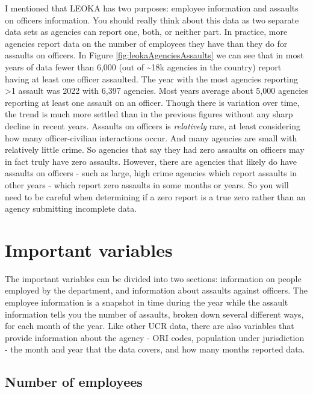 \documentclass[
]{krantz}
\begin{document}
I mentioned that LEOKA has two purposes: employee
information and assaults on officers information. You should
really think about this data as two separate data sets as
agencies can report one, both, or neither part. In practice,
more agencies report data on the number of employees they
have than they do for assaults on officers. In Figure
\ref{fig:leokaAgenciesAssaults} we can see that in most
years of data fewer than 6,000 (out of \textasciitilde18k
agencies in the country) report having at least one officer
assaulted. The year with the most agencies reporting
\textgreater1 assault was 2022 with 6,397 agencies. Most
years average about 5,000 agencies reporting at least one
assault on an officer. Though there is variation over time,
the trend is much more settled than in the previous figures
without any sharp decline in recent years. Assaults on
officers is \emph{relatively} rare, at least considering how
many officer-civilian interactions occur. And many agencies
are small with relatively little crime. So agencies that say
they had zero assaults on officers may in fact truly have
zero assaults. However, there are agencies that likely do
have assaults on officers - such as large, high crime
agencies which report assaults in other years - which report
zero assaults in some months or years. So you will need to
be careful when determining if a zero report is a true zero
rather than an agency submitting incomplete data.

\section{Important variables}\label{important-variables-4}

The important variables can be divided into two sections:
information on people employed by the department, and
information about assaults against officers. The employee
information is a snapshot in time during the year while the
assault information tells you the number of assaults, broken
down several different ways, for each month of the year.
Like other UCR data, there are also variables that provide
information about the agency - ORI codes, population under
jurisdiction - the month and year that the data covers, and
how many months reported data.

\subsection{Number of employees}\label{number-of-employees}
\end{document}
